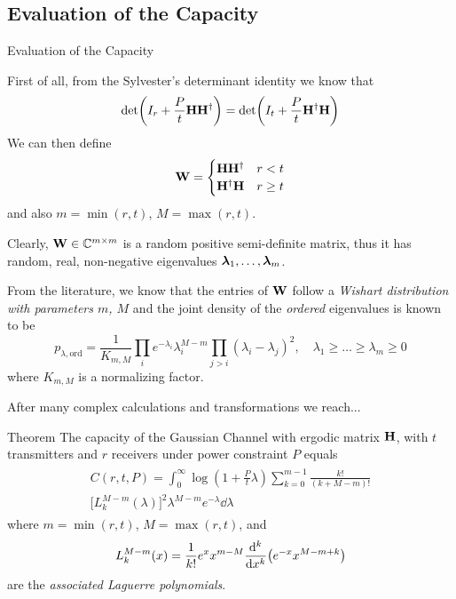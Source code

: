\subsection{Evaluation of the Capacity}
\begin{frame}[allowframebreaks]{Evaluation of the Capacity}

First of all, from the Sylvester's determinant identity we know that
$$\det(I_r + \frac{P}{t}\vb{H\ensuremath{H^\dagger}}) = \det(I_t + \frac{P}{t}\vb{\ensuremath{H^\dagger}H})$$
We can then define
\begin{equation*}
\vb{W}=\begin{cases}
\vb{H\ensuremath{H^\dagger}}	& r<t\\
\vb{\ensuremath{H^\dagger}H}	& r\geq t
\end{cases}
\end{equation*}
and also $m=\min(r,t)$, $M=\max(r,t)$.

\medskip
Clearly, $\vb{W}\in \mathbb{C}^{m\times m}$ is a random positive semi-definite matrix, thus it has random, real, non-negative eigenvalues $\vb*{\lambda}_1,\ldots,\vb*{\lambda}_m$.

\framebreak

From the literature, we know that the entries of $\vb{W}$ follow a \textit{Wishart distribution with parameters $m$, $M$} and the joint density of the \textit{ordered} eigenvalues is known to be \cite{james1964}
$$p_{\lambda,\text{ord}} = 	\frac{1}{K_{m,M}}
\prod_i e^{-\lambda_i}\lambda_i^{M-m}
\prod_{j>i} (\lambda_i-\lambda_j)^2,
\quad \lambda_1\geq \ldots \geq \lambda_m \geq 0 $$
where $K_{m,M}$ is a normalizing factor.

\medskip
After many complex calculations and transformations we reach...

\framebreak

\begin{alertblock}{Theorem}
	The capacity of the Gaussian Channel with ergodic matrix $\vb{H}$, with $t$ transmitters and $r$ receivers under power constraint $P$ equals
	\begin{align}\label{eq:capacity_ergodic}
	\begin{split}
	C(r,t,P) = \int_0^\infty \log(1+\frac{P}{t}\lambda)
	\sum_{k=0}^{m-1} \frac{k!}{(k+M-m)!}\\
	\Big[L_k^{M-m}(\lambda)\Big]^2
	\lambda^{M-m} e^{-\lambda}
	\dd{\lambda}
	\end{split}
	\end{align}
	where $m=\min(r,t)$, $M=\max(r,t)$, and
	$$L_k^{M-m}(x) = \frac{1}{k!}
	e^x x^{m-M}
	\dv[k]{}{x}
	\qty(e^{-x}x^{M-m+k})$$
	are the \textit{associated Laguerre polynomials}.
\end{alertblock}

\end{frame}

